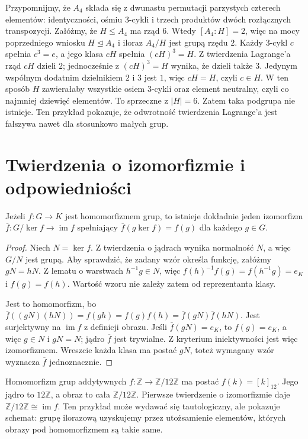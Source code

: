 \begin{przyklad}
\label{aa:prz:a4-bez-szostki}
Przypomnijmy, że $A_4$ składa się z dwunastu permutacji
parzystych czterech elementów: identyczności, ośmiu $3$-cykli
i trzech produktów dwóch rozłącznych transpozycji.
Załóżmy, że $H\le A_4$ ma rząd $6$.
Wtedy $[A_4:H]=2$, więc na mocy poprzedniego wniosku
$H\trianglelefteq A_4$ i iloraz $A_4/H$ jest grupą rzędu $2$.
Każdy $3$-cykl $c$ spełnia $c^3=e$, a jego klasa
$cH$ spełnia $(cH)^3=H$.
Z twierdzenia Lagrange'a rząd $cH$ dzieli $2$;
jednocześnie z $(cH)^3=H$ wynika, że dzieli także $3$.
Jedynym wspólnym dodatnim dzielnikiem $2$ i $3$ jest $1$,
więc $cH=H$, czyli $c\in H$.
W ten sposób $H$ zawierałaby wszystkie osiem $3$-cykli
oraz element neutralny, czyli co najmniej dziewięć elementów.
To sprzeczne z $|H|=6$. Zatem taka podgrupa nie istnieje.
Ten przykład pokazuje, że odwrotność twierdzenia Lagrange'a
jest fałszywa nawet dla stosunkowo małych grup.
\end{przyklad}

\section{Twierdzenia o izomorfizmie i odpowiedniości}
\begin{twierdzenie}
\label{aa:tw:izo-pierwsze}
Jeżeli $f:G\to K$ jest homomorfizmem grup, to istnieje
dokładnie jeden izomorfizm
$\overline f:G/\ker f\to\operatorname{im}f$
spełniający $\overline f(g\ker f)=f(g)$ dla każdego $g\in G$.
\end{twierdzenie}
\begin{proof}
Niech $N=\ker f$. Z twierdzenia o jądrach wynika normalność $N$,
a więc $G/N$ jest grupą.
Aby sprawdzić, że zadany wzór określa funkcję,
załóżmy $gN=hN$. Z lematu o warstwach $h^{-1}g\in N$,
więc $f(h)^{-1}f(g)=f(h^{-1}g)=e_K$ i $f(g)=f(h)$.
Wartość wzoru nie zależy zatem od reprezentanta klasy.

Jest to homomorfizm, bo
$\overline f((gN)(hN))=f(gh)=f(g)f(h)
=\overline f(gN)\overline f(hN)$.
Jest surjektywny na $\operatorname{im}f$ z definicji obrazu.
Jeśli $\overline f(gN)=e_K$, to $f(g)=e_K$, a więc
$g\in N$ i $gN=N$; jądro $\overline f$ jest trywialne.
Z kryterium iniektywności jest więc izomorfizmem.
Wreszcie każda klasa ma postać $gN$, toteż wymagany
wzór wyznacza $\overline f$ jednoznacznie.
\end{proof}

\begin{przyklad}
Homomorfizm grup addytywnych $f:\mathbb Z\to\mathbb Z/12\mathbb Z$
ma postać $f(k)=[k]_{12}$. Jego jądro to $12\mathbb Z$,
a obraz to cała $\mathbb Z/12\mathbb Z$. Pierwsze twierdzenie
o izomorfizmie daje $\mathbb Z/12\mathbb Z\cong\operatorname{im}f$.
Ten przykład może wydawać się tautologiczny, ale pokazuje schemat:
grupę ilorazową uzyskujemy przez utożsamienie elementów,
których obrazy pod homomorfizmem są takie same.
\end{przyklad}

